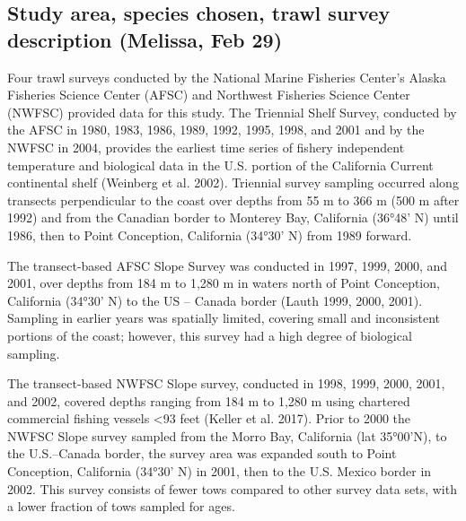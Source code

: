 \documentclass[
]{article}
\begin{document}
\hypertarget{study-area-species-chosen-trawl-survey-description-melissa-feb-29}{%
\subsection{Study area, species chosen, trawl survey description
(Melissa, Feb
29)}\label{study-area-species-chosen-trawl-survey-description-melissa-feb-29}}

Four trawl surveys conducted by the National Marine Fisheries Center's
Alaska Fisheries Science Center (AFSC) and Northwest Fisheries Science
Center (NWFSC) provided data for this study. The Triennial Shelf Survey,
conducted by the AFSC in 1980, 1983, 1986, 1989, 1992, 1995, 1998, and
2001 and by the NWFSC in 2004, provides the earliest time series of
fishery independent temperature and biological data in the U.S. portion
of the California Current continental shelf (Weinberg et al. 2002).
Triennial survey sampling occurred along transects perpendicular to the
coast over depths from 55 m to 366 m (500 m after 1992) and from the
Canadian border to Monterey Bay, California (36°48' N) until 1986, then
to Point Conception, California (34°30' N) from 1989 forward.

The transect-based AFSC Slope Survey was conducted in 1997, 1999, 2000,
and 2001, over depths from 184 m to 1,280 m in waters north of Point
Conception, California (34°30' N) to the US -- Canada border (Lauth
1999, 2000, 2001). Sampling in earlier years was spatially limited,
covering small and inconsistent portions of the coast; however, this
survey had a high degree of biological sampling.

The transect-based NWFSC Slope survey, conducted in 1998, 1999, 2000,
2001, and 2002, covered depths ranging from 184 m to 1,280 m using
chartered commercial fishing vessels \textless93 feet (Keller et al.
2017). Prior to 2000 the NWFSC Slope survey sampled from the Morro Bay,
California (lat 35°00'N), to the U.S.--Canada border, the survey area
was expanded south to Point Conception, California (34°30' N) in 2001,
then to the U.S. Mexico border in 2002. This survey consists of fewer
tows compared to other survey data sets, with a lower fraction of tows
sampled for ages.
\end{document}
